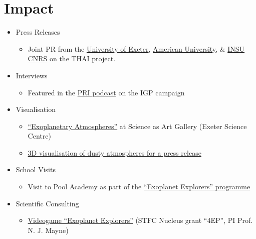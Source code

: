 \documentclass[a4paper, 11pt]{article}
\begin{document}
\section{Impact}
\begin{itemize}[nosep, leftmargin=10pt]
    \item Press Releases
    \begin{itemize}
        \item Joint PR from the \href{https://www.exeter.ac.uk/research/news/articles/questtouncoverintricacies.html}{University of Exeter}, \href{https://www.american.edu/news/20220811-trappist-1.cfm}{American University}, \& \href{https://www.insu.cnrs.fr/fr/cnrsinfo/la-quete-pour-percer-le-mystere-des-climats-de-planetes-similaires-la-terre-avance}{INSU CNRS} on the THAI project.
    \end{itemize}
    \item Interviews
    \begin{itemize}
        \item Featured in the \href{https://theworld.org/stories/2018-08-03/sea-and-sky-scientists-brave-wicked-weather-explore-key-ocean-current}{PRI podcast} on the IGP campaign
    \end{itemize}
    \item Visualisation
    \begin{itemize}
        \item \href{https://exetersciencecentre.org/gallery/denis_sergeev_uoe_exoplanets/}{``Exoplanetary Atmospheres''} at Science as Art Gallery (Exeter Science Centre)
        \item \href{https://phys.org/news/2020-06-presence-airborne-signify-habitability-distant.html}{3D visualisation of dusty atmospheres for a press release}
    \end{itemize}
    \item School Visits
    \begin{itemize}
        \item Visit to Pool Academy as part of the \href{https://physics-astronomy.exeter.ac.uk/exoplanetexplorers/}{``Exoplanet Explorers'' programme}
    \end{itemize}
    \item Scientific Consulting
    \begin{itemize}
        \item \href{https://www.wethecurious.org/curious-stuff/stargazing-night-sky/exoplanet-explorers}{Videogame ``Exoplanet Explorers''} (STFC Nucleus grant ``4EP'', PI Prof. N. J. Mayne)
    \end{itemize}

\end{itemize}
\end{document}
